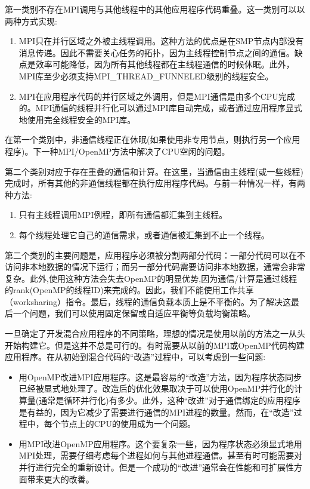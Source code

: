 第一类别不存在MPI调用与其他线程中的其他应用程序代码重叠。这一类别可以以两种方式实现\citep{rabenseifner2003hybrid}:  

\begin{enumerate}
	\item MPI只在并行区域之外被主线程调用。这种方法的优点是在SMP节点内部没有消息传递。因此不需要关心任务的拓扑，因为主线程控制节点之间的通信。缺点是效率可能降低，因为所有其他线程都在主线程通信的时候休眠。此外，MPI库至少必须支持MPI\_THREAD\_FUNNELED级别的线程安全。
	\item MPI在应用程序代码的并行区域之外调用，但是MPI通信是由多个CPU完成的。MPI通信的线程并行化可以通过MPI库自动完成，或者通过应用程序显式地使用完全线程安全的MPI库。
\end{enumerate}

在第一个类别中，非通信线程正在休眠(如果使用非专用节点，则执行另一个应用程序)。下一种MPI/OpenMP方法中解决了CPU空闲的问题。

第二个类别对应于存在重叠的通信和计算。在这里，当通信由主线程(或一些线程)完成时，所有其他的非通信线程都在执行应用程序代码。与前一种情况一样，有两种方法:

\begin{enumerate}
	\item 只有主线程调用MPI例程，即所有通信都汇集到主线程。
	\item 每个线程处理它自己的通信需求，或者通信被汇集到不止一个线程。
\end{enumerate}

第二个类别的主要问题是，应用程序必须被分割两部分代码：一部分代码可以在不访问非本地数据的情况下运行；而另一部分代码需要访问非本地数据，通常会非常复杂。此外,使用这种方法会失去OpenMP的明显优势,因为通信/计算是通过线程的rank(OpenMP的线程ID)来完成的。因此，我们不能使用工作共享（worksharing）指令。最后，线程的通信负载本质上是不平衡的。为了解决这最后一个问题，我们可以使用固定保留或自适应平衡等负载均衡策略\citep{rabenseifner2003hybrid}。  

一旦确定了开发混合应用程序的不同策略，理想的情况是使用以前的方法之一从头开始构建它。但是这并不总是可行的。有时需要从以前的MPI或OpenMP代码构建应用程序。在从初始到混合代码的“改造”过程中，可以考虑到一些问题\citep{estrade2009hybrid}: 
 
 \begin{itemize}
 	\item 用OpenMP改进MPI应用程序。这是最容易的“改造”方法，因为程序状态同步已经被显式地处理了。改造后的优化效果取决于可以使用OpenMP并行化的计算量(通常是循环并行化)有多少。此外，这种“改进”对于通信绑定的应用程序是有益的，因为它减少了需要进行通信的MPI进程的数量。然而，在“改造”过程中，每个节点上的CPU的使用成为一个问题。
 	\item 用MPI改进OpenMP应用程序。这个要复杂一些，因为程序状态必须显式地用MPI处理，需要仔细考虑每个进程如何与其他进程通信。甚至有时可能需要对并行进行完全的重新设计。但是一个成功的“改进”通常会在性能和可扩展性方面带来更大的改善。
 \end{itemize}
 
